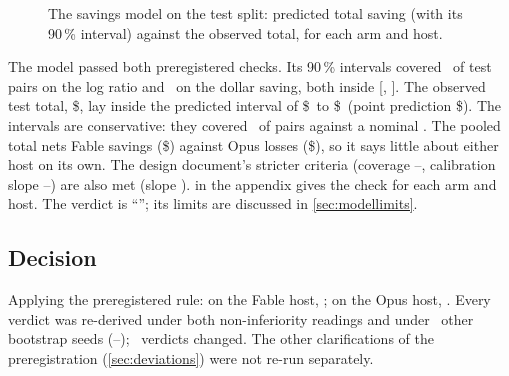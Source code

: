 \begin{figure}[htbp]
\centering
{}\par\smallskip

\caption{The savings model on the test split: predicted total saving (with its 90\,\% interval) against the
observed total, for each arm and host.}
\label{fig:model}
\end{figure}

The model passed both preregistered checks. Its 90\,\% intervals covered \MCCovLog\ of test pairs on the log
ratio and \MCCovUSD\ on the dollar saving, both inside [\CovLow, \CovHigh]. The observed test total,
\$\MCObserved, lay inside the predicted interval of \$\MCPILow\ to \$\MCPIHigh\ (point prediction
\$\MCPredicted). The intervals are conservative: they covered \MCCovLog\ of pairs against a nominal
\MCNominal. The pooled total nets Fable savings (\$\MCFableTotal) against Opus losses (\$\MCOpusTotal), so
it says little about either host on its own. The design document's stricter criteria (coverage
\DesignCovLow--\DesignCovHigh, calibration slope \DesignSlopeLow--\DesignSlopeHigh) are also met (slope
\MCSlope).  in the appendix gives the check for each arm and host. The verdict is
``\MCVerdict''; its limits are discussed in \cref{sec:modellimits}.

\subsection{Decision}

Applying the preregistered rule: on the Fable host, \textbf{\DecisionFable}; on the Opus host,
\textbf{\DecisionOpus}. Every verdict was re-derived under both non-inferiority readings and under
\NSeeds\ other bootstrap seeds (\SeedLo--\SeedHi); \SeedsChanged\ verdicts changed. The other
clarifications of the preregistration (\cref{sec:deviations}) were not re-run separately.
